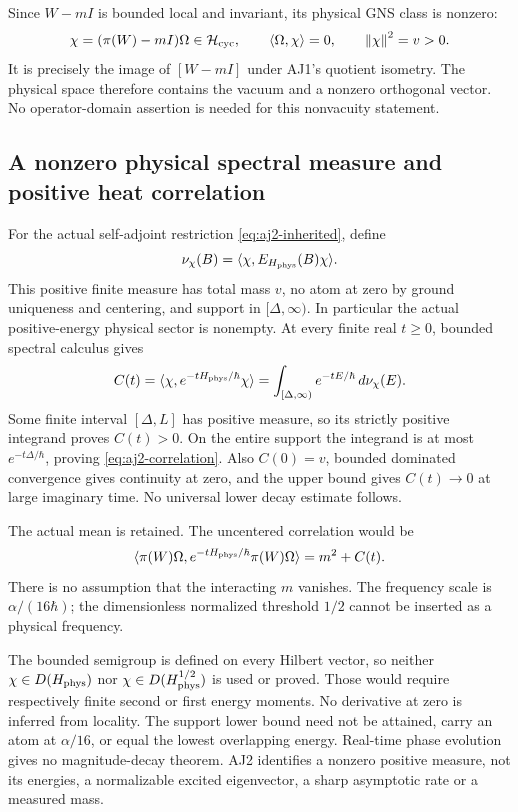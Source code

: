 Since $W-mI$ is bounded local and invariant, its physical GNS class is nonzero:
\begin{equation}
 \chi=(\pi(W)-mI)\Omega\in\mathcal H_{\rm cyc},\qquad
 \langle\Omega,\chi\rangle=0,\qquad\left\lVert\chi\right\rVert^2=v>0.
 \label{eq:aj2-vector}
\end{equation}
It is precisely the image of $[W-mI]$ under AJ1's quotient isometry. The physical space therefore contains the vacuum and a nonzero orthogonal vector. No operator-domain assertion is needed for this nonvacuity statement.

\subsection{A nonzero physical spectral measure and positive heat correlation}
For the actual self-adjoint restriction \eqref{eq:aj2-inherited}, define
\begin{equation}
 \nu_\chi(B)=\langle\chi,E_{H_{\rm phys}}(B)\chi\rangle.
\end{equation}
This positive finite measure has total mass $v$, no atom at zero by ground uniqueness and centering, and support in $[\Delta,\infty)$. In particular the actual positive-energy physical sector is nonempty. At every finite real $t\ge0$, bounded spectral calculus gives
\begin{equation}
 C(t)=\langle\chi,e^{-tH_{\rm phys}/\hbar}\chi\rangle
     =\int_{[\Delta,\infty)}e^{-tE/\hbar}\,d\nu_\chi(E).
 \label{eq:aj2-spectral}
\end{equation}
Some finite interval $[\Delta,L]$ has positive measure, so its strictly positive integrand proves $C(t)>0$. On the entire support the integrand is at most $e^{-t\Delta/\hbar}$, proving \eqref{eq:aj2-correlation}. Also $C(0)=v$, bounded dominated convergence gives continuity at zero, and the upper bound gives $C(t)\to0$ at large imaginary time. No universal lower decay estimate follows.

The actual mean is retained. The uncentered correlation would be
\begin{equation}
 \langle\pi(W)\Omega,e^{-tH_{\rm phys}/\hbar}\pi(W)\Omega\rangle
 =m^2+C(t).
\end{equation}
There is no assumption that the interacting $m$ vanishes. The frequency scale is $\alpha/(16\hbar)$; the dimensionless normalized threshold $1/2$ cannot be inserted as a physical frequency.

The bounded semigroup is defined on every Hilbert vector, so neither $\chi\in D(H_{\rm phys})$ nor $\chi\in D(H_{\rm phys}^{1/2})$ is used or proved. Those would require respectively finite second or first energy moments. No derivative at zero is inferred from locality. The support lower bound need not be attained, carry an atom at $\alpha/16$, or equal the lowest overlapping energy. Real-time phase evolution gives no magnitude-decay theorem. AJ2 identifies a nonzero positive measure, not its energies, a normalizable excited eigenvector, a sharp asymptotic rate or a measured mass.

